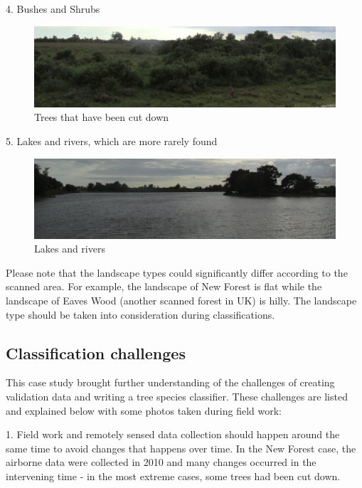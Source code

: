 \documentclass{subfiles}
\begin{document}
          \newpage
    
    4.	Bushes and Shrubs
          \begin{figure} [!h]
          	\centering
          	\includegraphics[width=\textwidth]{img/NewForest/LT_BushesAndShrubs}
          	\caption{Trees that have been cut down}
          	\label{fig:LT_BushesAndShrubs}
          \end{figure}

    
    5.	Lakes and rivers, which are more rarely found
          \begin{figure} [!h]
          	\centering
          	\includegraphics[width=\textwidth]{img/NewForest/LT_LakesAndRivers}
          	\caption{Lakes and rivers}
          	\label{fig:LT_LakesAndRivers}
          \end{figure}

    \par Please note that the landscape types could significantly differ according to the scanned area. For example, the landscape of New Forest is flat while the landscape of Eaves Wood (another scanned forest in UK) is hilly. The landscape type should be taken into consideration during classifications. 
    
    \subsection{Classification challenges}
    \par This case study brought further understanding of the challenges of creating validation data and writing a tree species classifier. These challenges are listed and explained below with some photos taken during field work:
    
    \par 1.	Field work and remotely sensed data collection should happen around the same time to avoid changes that happens over time. In the New Forest case, the airborne data were collected in 2010 and many changes occurred in the intervening time - in the most extreme cases, some trees had been cut down.
    
\end{document}
